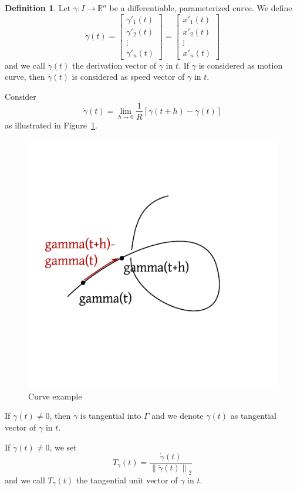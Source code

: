 \documentclass[a4paper,landscape,twocolumn]{article}
\theoremstyle{definition}
\newtheorem{defi}{Definition}
\newcommand\norm[1]{\left\|#1\right\|}
\begin{document}
\begin{defi}
  Let $\gamma: I \to \mathbb R^n$ be a differentiable, parameterized curve.
  We define
  \[
    \dot{\gamma}(t) =
    \begin{bmatrix} \gamma'_1(t) \\ \gamma'_2(t) \\ \vdots \\ \gamma'_n(t) \end{bmatrix}
    = \begin{bmatrix} x'_1(t) \\ x'_2(t) \\ \vdots \\ x'_n(t) \end{bmatrix}
  \]
  and we call $\dot\gamma(t)$ the derivation vector of $\gamma$ in $t$.
  If $\gamma$ is considered as motion curve, then $\dot\gamma(t)$ is considered as
  speed vector of $\gamma$ in $t$.

  Consider
  \[ \dot{\gamma}(t) = \lim_{h\to 0} \frac{1}{R} \left[\gamma(t + h) - \gamma(t)\right] \]
  as illustrated in Figure~\ref{img:curve_example}.

  \begin{figure}[!h]
    \begin{center}
      \includegraphics{img/curve_example.pdf}
      \caption{Curve example}
      \label{img:curve_example}
    \end{center}
  \end{figure}

  If $\dot{\gamma}(t) \neq 0$, then $\dot{\gamma}$ is tangential into $\Gamma$
  and we denote $\dot\gamma(t)$ as tangential vector of $\gamma$ in $t$.

  If $\dot\gamma(t) \neq 0$, we set
  \[ T_\gamma(t) = \frac{\dot\gamma(t)}{\norm{\dot\gamma(t)}_2} \]
  and we call $T_\gamma(t)$ the tangential unit vector of $\gamma$ in $t$.
\end{defi}
\end{document}
